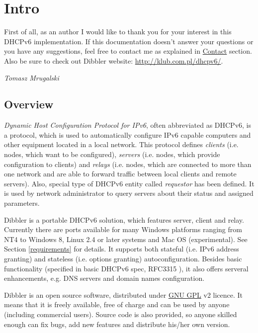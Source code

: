 
\section{Intro}
First of all, as an author I would like to thank you for your interest
in this DHCPv6 implementation. If this documentation doesn't answer
your questions or you have any suggestions, feel free to contact
me as explained in \hyperlink{contact}{Contact} section. Also be sure
to check out Dibbler website: \url{http://klub.com.pl/dhcpv6/}.

\begin{flushright}
\emph{Tomasz Mrugalski}
\end{flushright}

\subsection{Overview}

\emph{Dynamic Host Configuration Protocol for IPv6}, often abbreviated
as DHCPv6, is a protocol, which is used to automatically configure IPv6
capable computers and other equipment located in a local network. This
protocol defines \emph{clients} (i.e. nodes, which want to be configured),
\emph{servers} (i.e. nodes, which provide configuration to clients) and
\emph{relays} (i.e. nodes, which are connected to more than one network and
are able to forward traffic between local clients and remote
servers). Also, special type of DHCPv6 entity called \emph{requestor}
has been defined. It is used by network administrator to query servers
about their status and assigned parameters.

Dibbler is a portable DHCPv6 solution, which features server, client and
relay. Currently there are ports available for many Windows platforms
ranging from NT4 to Windows 8, Linux 2.4 or later systems and Mac OS
(experimental). See Section \ref{requirements} for details. It supports both stateful
(i.e. IPv6 address granting) and stateless (i.e. options granting)
autoconfiguration. Besides basic
functionality (specified in basic DHCPv6 spec, RFC3315 \cite{rfc3315}),
it also offers serveral enhancements, e.g. DNS servers and domain names
configuration.

Dibbler is an open source software, distributed under
\href{http://www.gnu.org/copyleft/gpl.html}{GNU GPL} v2 licence. It means
that it is freely available, free of charge and can be used by anyone
(including commercial users). Source code is also provided, so anyone
skilled enough can fix bugs, add new features and distribute his/her
own version.

